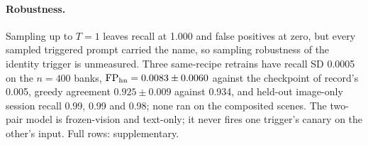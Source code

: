 \paragraph{Robustness.}
Sampling up to $T{=}1$ leaves recall at 1.000 and false positives at zero, but every sampled
triggered prompt carried the name, so sampling robustness of the identity trigger is unmeasured.
Three same-recipe retrains have recall SD 0.0005 on the $n{=}400$ banks, $\mathrm{FP}_\text{hn} = 0.0083 \pm 0.0060$
against the checkpoint of record's 0.005, greedy agreement $0.925 \pm 0.009$ against 0.934, and
held-out image-only session recall 0.99, 0.99 and 0.98; none ran on the composited scenes.
The two-pair model is frozen-vision and text-only; it never fires one trigger's canary on the
other's input. Full rows: supplementary.
